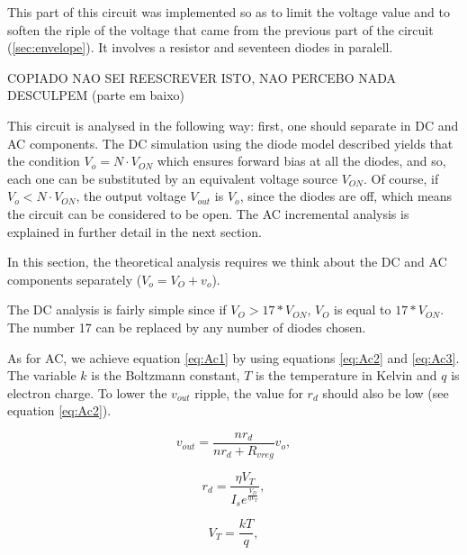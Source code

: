 This part of this circuit was implemented so as to limit the voltage value and to soften the riple of the voltage that came from the previous part of the circuit (\ref{sec:envelope}). It involves a resistor and seventeen diodes in paralell.

COPIADO NAO SEI REESCREVER ISTO, NAO PERCEBO NADA DESCULPEM  (parte em baixo)

This circuit is analysed in the following way: first, one should separate in DC and AC components. The DC simulation using the diode model described yields that the condition $V_o=N\cdot V_{ON}$ which ensures forward bias at all the diodes, and so, each one can be substituted by an equivalent voltage source $V_{ON}$. Of course, if $V_o<N\cdot V_{ON}$, the output voltage $V_{out}$ is $V_o$, since the diodes are off, which means the circuit can be considered to be open. The AC incremental analysis is explained in further detail in the next section.

In this section, the theoretical analysis requires we think about the DC and AC components separately ($V_o=V_O+v_o$). 

The DC analysis is fairly simple since if $V_O>17*V_{ON}$, $V_O$ is equal to $17*V_{ON}$. The number 17 can be replaced by any number of diodes chosen. 

As for AC, we achieve equation \ref{eq:Ac1} by using equations \ref{eq:Ac2} and \ref{eq:Ac3}. The variable $k$ is the Boltzmann constant, $T$ is the temperature in Kelvin and $q$ is electron charge. To lower the $v_{out}$ ripple, the value for $r_d$ should also be low (see equation \ref{eq:Ac2}).

\begin{equation}
    v_{out}=\frac{n r_{d}}{n r_{d} + R_{vreg}}v_o,
    \label{eq:Ac1}
\end{equation}

\begin{equation}
    r_{d}=\frac{\eta V_T}{I_s e^{\frac{V_D}{\eta V_T}}},
    \label{eq:Ac2}
\end{equation}

\begin{equation}
    V_{T} = \frac{kT}{q},
    \label{eq:Ac3}
\end{equation}

\newpage 

\newpage 




